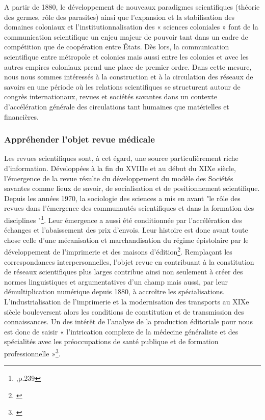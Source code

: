 A partir de 1880, le développement de nouveaux paradigmes scientifiques (théorie des germes, rôle des parasites) ainsi que l’expansion et la stabilisation des domaines coloniaux et l’institutionnalisation des « sciences coloniales » font de la communication scientifique un enjeu majeur de pouvoir tant dans un cadre de compétition que de coopération entre États. Dès lors, la communication scientifique entre métropole et colonies mais aussi entre les colonies et avec les autres empires coloniaux prend une place de premier ordre. Dans cette mesure, nous nous sommes intéressés à la construction et à la circulation des réseaux de savoirs en une période où les relations scientifiques se structurent autour de congrès internationaux, revues et sociétés savantes dans un contexte d'accélération générale des circulations tant humaines que matérielles et financières.


 \subsubsection*{Appréhender l'objet revue médicale}
Les revues scientifiques sont, à cet égard, une source particulièrement riche d'information. Développées à la fin du XVIIIe et au début du XIXe siècle, l'émergence de la revue résulte du développement du modèle des Sociétés savantes comme lieux de savoir, de socialisation et de positionnement scientifique. Depuis les années 1970, la sociologie des sciences a mis en avant "le rôle des revues dans l'émergence des communautés scientifiques et dans la formation des disciplines "\footnote{\cite{duclert_les_2002},p.239}. Leur émergence a aussi été conditionnée par l'accélération des échanges et l'abaissement des prix d'envois. 
Leur histoire est donc avant toute chose celle d'une \og mécanisation et marchandisation du régime épistolaire par le développement de l’imprimerie et des maisons d'édition\fg \footnote{\cite{guedon_lhistoire_2017,tesniere_au_2021}}. Remplaçant les correspondances interpersonnelles, l'objet revue en contribuant à la constitution de réseaux scientifiques plus larges contribue ainsi non seulement à créer des normes linguistiques et argumentatives d'un champ mais aussi, par leur démultiplication numérique depuis 1880, à accroître les spécialisations. L'industrialisation de l’imprimerie et la modernisation des transports au XIXe siècle bouleversent alors les conditions de constitution et de transmission des connaissances. Un des intérêt de l'analyse de la production éditoriale pour nous est donc de saisir « l’intrication complexe de la médecine généraliste et des spécialités avec les préoccupations de santé publique et de formation professionnelle »\footnote{\cite{tesniere_les_2014}}. 


